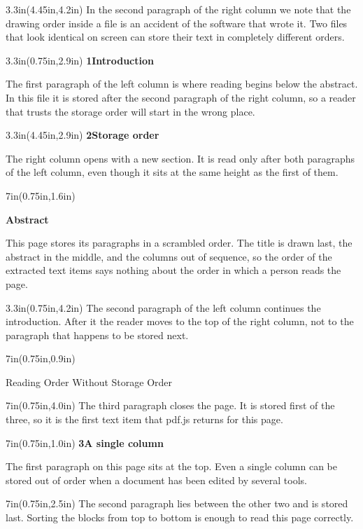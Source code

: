 \documentclass[10pt]{article}
\newcommand{\leftcol}[2]{\begin{textblock*}{3.3in}(0.75in,#1in)#2\end{textblock*}}
\newcommand{\rightcol}[2]{\begin{textblock*}{3.3in}(4.45in,#1in)#2\end{textblock*}}
\newcommand{\fullwidth}[2]{\begin{textblock*}{7in}(0.75in,#1in)#2\end{textblock*}}
\begin{document}
\null
\rightcol{4.2}{%
  In the second paragraph of the right column we note that the drawing order
  inside a file is an accident of the software that wrote it. Two files that
  look identical on screen can store their text in completely different
  orders.}
\leftcol{2.9}{%
  \textbf{1\quad Introduction}\par\medskip
  The first paragraph of the left column is where reading begins below the
  abstract. In this file it is stored after the second paragraph of the right
  column, so a reader that trusts the storage order will start in the wrong
  place.}
\rightcol{2.9}{%
  \textbf{2\quad Storage order}\par\medskip
  The right column opens with a new section. It is read only after both
  paragraphs of the left column, even though it sits at the same height as
  the first of them.}
\fullwidth{1.6}{%
  \centerline{\textbf{Abstract}}\par\smallskip
  This page stores its paragraphs in a scrambled order. The title is drawn
  last, the abstract in the middle, and the columns out of sequence, so the
  order of the extracted text items says nothing about the order in which a
  person reads the page.}
\leftcol{4.2}{%
  The second paragraph of the left column continues the introduction. After
  it the reader moves to the top of the right column, not to the paragraph
  that happens to be stored next.}
\fullwidth{0.9}{%
  \centerline{\Large Reading Order Without Storage Order}}
\clearpage

\null
\fullwidth{4.0}{%
  The third paragraph closes the page. It is stored first of the three, so it
  is the first text item that pdf.js returns for this page.}
\fullwidth{1.0}{%
  \textbf{3\quad A single column}\par\medskip
  The first paragraph on this page sits at the top. Even a single column can
  be stored out of order when a document has been edited by several tools.}
\fullwidth{2.5}{%
  The second paragraph lies between the other two and is stored last. Sorting
  the blocks from top to bottom is enough to read this page correctly.}
\end{document}
